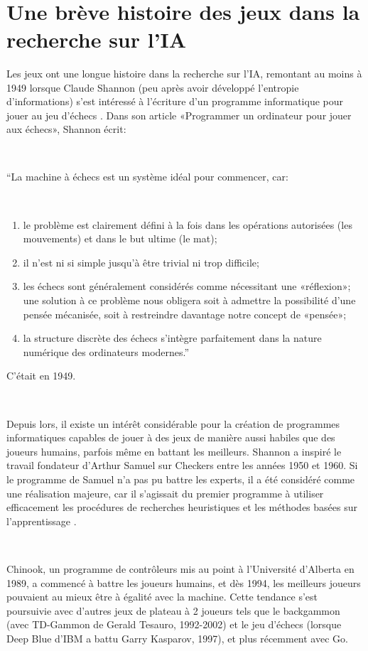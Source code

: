 ~\par

\section{Une brève histoire des jeux dans la recherche sur l'IA}

Les jeux ont une longue histoire dans la recherche sur l'IA, remontant au moins à 1949 lorsque Claude Shannon (peu après avoir développé l'entropie d'informations) s'est intéressé à l'écriture d'un programme informatique pour jouer au jeu d'échecs \parencite{unity2}. Dans son article «Programmer un ordinateur pour jouer aux échecs», Shannon écrit:

~\par
“La machine à échecs est un système idéal pour commencer, car: 

~\par
\begin{enumerate}
\item le problème est clairement défini à la fois dans les opérations autorisées (les mouvements) et dans le but ultime (le mat); 
\item il n'est ni si simple jusqu'à être trivial ni trop difficile; 
\item les échecs sont généralement considérés comme nécessitant une «réflexion»; une solution à ce problème nous obligera soit à admettre la possibilité d'une pensée mécanisée, soit à restreindre davantage notre concept de «pensée»; 
\item la structure discrète des échecs s’intègre parfaitement dans la nature numérique des ordinateurs modernes.”

\end{enumerate}

C'était en 1949.

~\par
Depuis lors, il existe un intérêt considérable pour la création de programmes informatiques capables de jouer à des jeux de manière aussi habiles que des joueurs humains, parfois même en battant les meilleurs. Shannon a inspiré le travail fondateur d’Arthur Samuel sur Checkers entre les années 1950 et 1960. Si le programme de Samuel n’a pas pu battre les experts, il a été considéré comme une réalisation majeure, car il s’agissait du premier programme à utiliser efficacement les procédures de recherches heuristiques et les méthodes basées sur l’apprentissage \parencite{unity1}.


~\par
Chinook, un programme de contrôleurs mis au point à l’Université d'Alberta en 1989, a commencé à battre les joueurs humains, et dès 1994, les meilleurs joueurs pouvaient au mieux être à égalité avec la machine. Cette tendance s’est poursuivie avec d’autres jeux de plateau à 2 joueurs tels que le backgammon (avec TD-Gammon de Gerald Tesauro, 1992-2002) et le jeu d'échecs (lorsque Deep Blue d’IBM a battu Garry Kasparov, 1997), et plus récemment avec Go.


